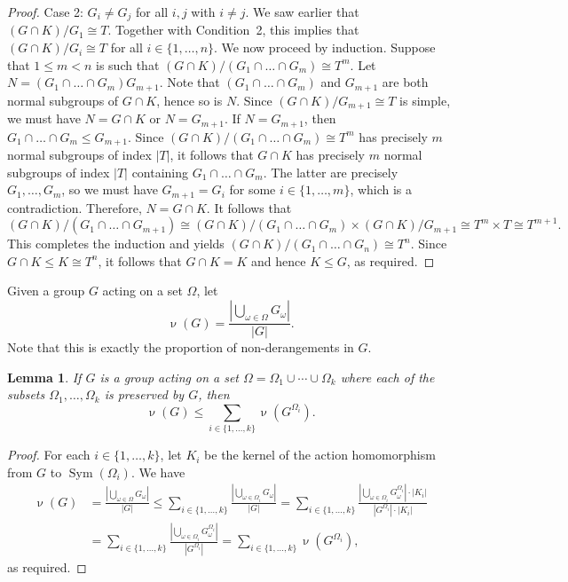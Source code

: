 \documentclass[11pt,a4paper]{amsart}
\newtheorem{lemma}[theorem]{Lemma}
\theoremstyle{definition}
\DeclareMathOperator{\Sym}{Sym}
\DeclareMathOperator{\pndr}{\nu}
\begin{document}
\begin{proof}
Case 2: $G_i \neq G_j$ for all $i,j$ with $i\neq j$. We saw earlier that $(G\cap K)/G_1\cong T$. Together with Condition~2,  this implies that $(G\cap K)/G_i\cong T$ for all $i\in\{1,\ldots,n\}$. We now proceed by induction. Suppose that $1\leq m<n$ is such that $(G\cap K)/(G_1  \cap \dots \cap G_m)\cong T^m$. Let $N=(G_1  \cap \dots\cap G_m) G_{m+1}$. Note that  $(G_1  \cap \dots\cap G_m)$ and $G_{m+1}$ are both normal subgroups of $G\cap K$, hence so is $N$. Since $(G\cap K)/G_{m+1}\cong T$ is simple, we must have $N=G\cap K$ or $N = G_{m+1}$. If $N = G_{m+1}$, then $G_1 \cap \dots\cap G_m \leq G_{m+1}$. Since $(G\cap K) /(G_1  \cap \dots\cap G_m) \cong T^m$ has precisely $m$ normal subgroups of index $|T|$, it follows that $G \cap K$ has precisely $m$ normal subgroups of index $|T|$ containing $G_1 \cap \dots \cap G_m$. The latter are precisely $G_1,\dots,G_m$, so we must have $G_{m+1}=G_i$ for some $i \in \{1,\dots,m\}$, which is a contradiction. Therefore, $N = G \cap K$. It follows that
\[
(G\cap K)/(G_1 \cap \dots \cap G_{m+1})\cong (G\cap K)/(G_1 \cap \dots \cap G_m)\times (G\cap K)/G_{m+1} \cong T^m \times T \cong T^{m+1}.
\]
This completes the induction and yields $(G\cap K)/(G_1 \cap \dots \cap G_n) \cong T^n$. Since $G \cap K \leq K \cong T^n$, it follows that $G \cap K=K$ and hence $K \leq G$, as required.
\end{proof}

Given a group $G$ acting on a set $\Omega$, let 
$$\pndr(G)=\frac{|\bigcup_{\omega \in \Omega} G_\omega|}{|G|}.$$ 
Note that this is exactly the proportion of non-derangements in $G$. 

\begin{lemma} \label{lemma:proportion}
If $G$ is a group acting on a set $\Omega=\Omega_1\cup\cdots\cup\Omega_k$ where each of the subsets $\Omega_1,\dots,\Omega_k$ is preserved by $G$, then
$$\pndr(G)\leq \sum_{i\in\{1,\ldots,k\}} \pndr(G^{\Omega_i}).$$
\end{lemma}
\begin{proof}

For each $i \in \{1,\dots,k\}$, let $K_i$ be the kernel of the action homomorphism from $G$ to $\Sym(\Omega_i)$. We have
\begin{align*}
\pndr(G)&=\frac{|\bigcup_{\omega \in \Omega} G_\omega|}{|G|} \leq \sum_{i\in\{1,\ldots,k\}} \frac{|\bigcup_{\omega \in \Omega_i} G_\omega|}{|G|} = \sum_{i\in\{1,\ldots,k\}} \frac{|\bigcup_{\omega \in \Omega_i} G_\omega^{\Omega_i}|\cdot |K_i|}{|G^{\Omega_i}|\cdot |K_i|}\\
&=\sum_{i\in\{1,\ldots,k\}} \frac{|\bigcup_{\omega \in \Omega_i} G_\omega^{\Omega_i}|}{|G^{\Omega_i}|}=\sum_{i\in\{1,\ldots,k\}} \pndr(G^{\Omega_i}),
\end{align*}
as required.
\end{proof}
\end{document}
